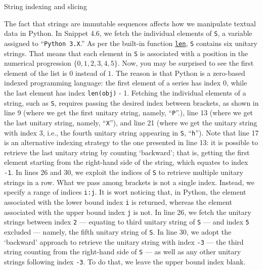 \documentclass[a4paper,11pt]{book}
\numberwithin{figure}{chapter}
\numberwithin{table}{chapter}
\newcommand{\question}[1]{%
    \begin{tcolorbox}[colback=comp_c!10,colframe=comp_c,sidebyside align=top,width=\linewidth,before skip=1ex]
        #1
    \end{tcolorbox}%
    \switchcolumn%
}
\newcommand{\note}[1]{%
    \begin{tcolorbox}[colback=white!0,colframe=white!10,width=\linewidth,before skip=1ex]
        #1
    \end{tcolorbox}         
}
\begin{document}
\begin{paracol}{2}
	\question{String indexing and slicing}
	\note{The fact that strings are immutable sequences affects how we manipulate textual data in Python. In Snippet 4.6, we fetch the individual elements of \texttt{S}, a variable assigned to ``\texttt{Python 3.X}.'' As per the built-in function \href{https://docs.python.org/3/tutorial/introduction.html#strings}{\texttt{len}}, \texttt{S} contains six unitary strings. That means that each element in \texttt{S} is associated with a position in the numerical progression $\{0, 1, 2, 3, 4, 5\}$. Now, you may be surprised to see the first element of the list is $0$ instead of $1$. The reason is that Python is a zero-based indexed programming language: the first element of a series has index $0$, while the last element has index \texttt{len(obj)} - 1.  Fetching the individual elements of a string, such as \texttt{S}, requires passing the desired index between brackets, as shown in line 9 (where we get the first unitary string, namely, ``\texttt{P}''.), line 13 (where we get the last unitary string, namely, ``\texttt{X}''), and line 21 (where we get the unitary string with index $3$, i.e., the fourth unitary string appearing in \texttt{S}, ``\texttt{h}''). Note that line 17 is an alternative indexing strategy to the one presented in line 13: it is possible to retrieve the last unitary string by counting `backward'; that is, getting the first element starting from the right-hand side of the string, which equates to index \texttt{-1}. In lines 26 and 30, we exploit the indices of \texttt{S} to retrieve multiple unitary strings in a row. What we pass among brackets is not a single index. Instead, we specify a range of indices \texttt{i:j}. It is wort noticing that, in Python, the element associated with the lower bound index \texttt{i} is returned, whereas the element associated with the upper bound index \texttt{j} is not. In line 26, we fetch the unitary strings between index \texttt{2} --- equating to third unitary string of \texttt{S} --- and index \texttt{5} excluded --- namely, the fifth unitary string of \texttt{S}. In line 30, we adopt the `backward' approach to retrieve the unitary string with index \texttt{-3} --- the third string counting from the right-hand side of \texttt{S} --- as well as any other unitary strings following index \texttt{-3}. To do that, we leave the upper bound index blank.} 
\end{paracol}
\clearpage
\end{document}

